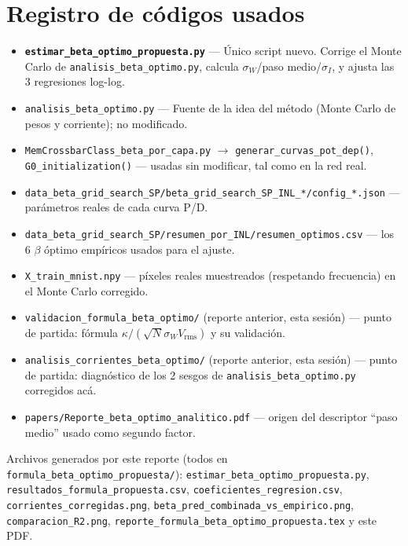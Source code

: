 \documentclass[11pt]{article}
\begin{document}
\section{Registro de códigos usados}

\begin{itemize}
\item \textbf{\texttt{estimar\_beta\_optimo\_propuesta.py}} --- Único
  script nuevo. Corrige el Monte Carlo de \texttt{analisis\_beta\_optimo.py},
  calcula $\sigma_W$/paso medio/$\sigma_I$, y ajusta las 3 regresiones
  log-log.
\item \texttt{analisis\_beta\_optimo.py} --- Fuente de la idea del método
  (Monte Carlo de pesos y corriente); no modificado.
\item \texttt{MemCrossbarClass\_beta\_por\_capa.py}
  $\to$ \texttt{generar\_curvas\_pot\_dep()}, \texttt{G0\_initialization()}
  --- usadas sin modificar, tal como en la red real.
\item \texttt{data\_beta\_grid\_search\_SP/beta\_grid\_search\_SP\_INL\_*/config\_*.json}
  --- parámetros reales de cada curva P/D.
\item \texttt{data\_beta\_grid\_search\_SP/resumen\_por\_INL/resumen\_optimos.csv}
  --- los 6 $\beta$ óptimo empíricos usados para el ajuste.
\item \texttt{X\_train\_mnist.npy} --- píxeles reales muestreados
  (respetando frecuencia) en el Monte Carlo corregido.
\item \texttt{validacion\_formula\_beta\_optimo/} (reporte anterior, esta
  sesión) --- punto de partida: fórmula $\kappa/(\sqrt{N}\sigma_W V_{\mathrm{rms}})$
  y su validación.
\item \texttt{analisis\_corrientes\_beta\_optimo/} (reporte anterior, esta
  sesión) --- punto de partida: diagnóstico de los 2 sesgos de
  \texttt{analisis\_beta\_optimo.py} corregidos acá.
\item \texttt{papers/Reporte\_beta\_optimo\_analitico.pdf} --- origen del
  descriptor ``paso medio'' usado como segundo factor.
\end{itemize}

Archivos generados por este reporte (todos en
\texttt{formula\_beta\_optimo\_propuesta/}):
\texttt{estimar\_beta\_optimo\_propuesta.py},
\texttt{resultados\_formula\_propuesta.csv},
\texttt{coeficientes\_regresion.csv}, \texttt{corrientes\_corregidas.png},
\texttt{beta\_pred\_combinada\_vs\_empirico.png},
\texttt{comparacion\_R2.png},
\texttt{reporte\_formula\_beta\_optimo\_propuesta.tex} y este PDF.
\end{document}
